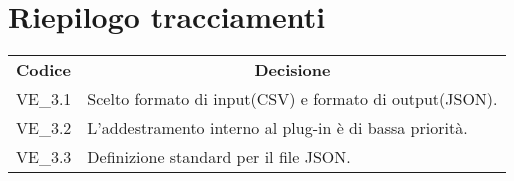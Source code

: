 
\section{Riepilogo tracciamenti}
\begin{longtable} {
		>{\centering}p{17mm} 
		>{}p{120mm}}
	\rowcolor{gray!50}
	\textbf{Codice} & \multicolumn{1}{c}{\textbf{Decisione}} \\%
	VE\_3.1 & Scelto formato di input(CSV) e formato di output(JSON). \TBstrut \\ [2mm]
	VE\_3.2 & L'addestramento interno al plug-in è di bassa priorità. \TBstrut \\ [2mm]
	VE\_3.3 & Definizione standard per il file JSON. \TBstrut \\ [2mm]
	
\end{longtable}